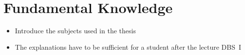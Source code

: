 \chapter{Fundamental Knowledge}
\begin{itemize}
  \item Introduce the subjects used in the thesis
  \item The explanations have to be sufficient for a student after the lecture DBS~I
\end{itemize}


